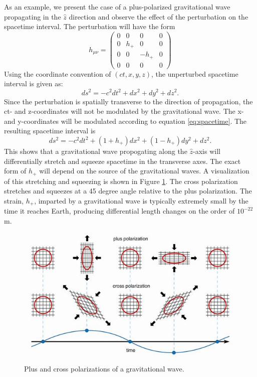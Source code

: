 As an example, we present the case of a plus-polarized gravitational wave 
propagating in the $\hat{z}$ direction and observe the effect of the perturbation 
on the spacetime interval. The perturbation will have the form 
\begin{equation}
h_{\mu\nu} = 
  \begin{pmatrix}
    0 & 0 & 0 & 0 \\
    0 & h_+ & 0 & 0 \\
    0 & 0 & -h_+ & 0 \\
    0 & 0 & 0 & 0
  \end{pmatrix}
\end{equation}
Using the coordinate convention of $(ct,x,y,z)$, the unperturbed
spacetime interval is given as: 
\begin{equation}
ds^2 = -c^2 dt^2 + dx^2 + dy^2 + dz^2.
\end{equation}
Since the perturbation is spatially transverse to the direction of 
propagation, the ct- and z-coordinates will not be modulated by the 
gravitational wave. The x- and y-coordinates will be modulated  
according to equation \ref{eq:spacetime}. The resulting spacetime 
interval is
\begin{equation}
ds^2 = -c^2 dt^2 + (1 + h_+)dx^2 + (1 - h_+)dy^2 + dz^2.
\end{equation}
This shows that a gravitational wave propogating along the $\hat{z}$-axis 
will differentially stretch and squeeze spacetime in the transverse 
axes. The exact form of $h_+$ will depend on the source of the 
gravitational waves. A visualization of this stretching and squeezing 
is shown in Figure \ref{fig:polarizations}\cite{Polarization}. The cross polarization  
stretches and squeezes at a 45 degree angle relative to the plus 
polarization. The strain, $h_+$, imparted by a gravitational wave is 
typically extremely small by the time it reaches Earth, producing 
differential length changes on the order of $10^{-22}$m. 

\begin{figure}[ht!]
\includegraphics[width=\textwidth]{figures/introduction/polarisations2}
\caption[Plus and cross polarizations]{Plus and cross polarizations %
         of a gravitational wave.}
\label{fig:polarizations}
\end{figure}


